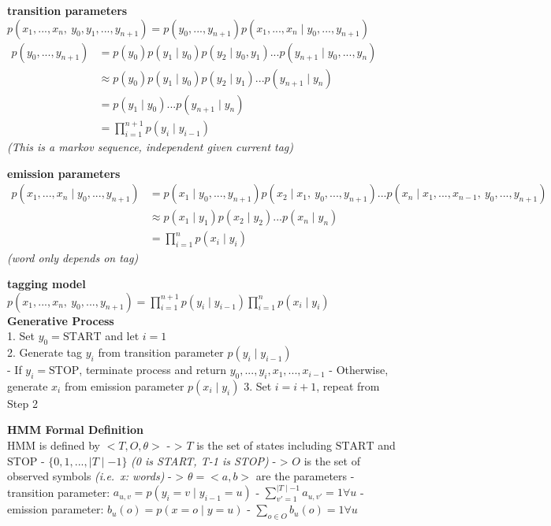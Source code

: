 \documentclass[11pt]{article}
\begin{document}
\textbf{transition parameters}\\
\(p(x_1,...,x_n,\ y_0,y_1,...,y_{n+1})=p(y_0,...,y_{n+1})p(x_1,...,x_n\mid y_0,...,y_{n+1})\)
\(\begin{aligned}p(y_0,...,y_{n+1})&=p(y_0)p(y_1\mid y_0)p(y_2\mid y_0,y_1)...p(y_{n+1}\mid y_0,...,y_n)\\&\approx p(y_0)p(y_1\mid y_0)p(y_2\mid y_1)...p(y_{n+1}\mid y_n)\\&=p(y_1\mid y_0)...p(y_{n+1}\mid y_n)\\&=\prod_{i=1}^{n+1}p(y_i\mid y_{i-1})\end{aligned}\)\\
\emph{(This is a markov sequence, independent given current tag)}

\textbf{emission parameters}\\
\(\begin{aligned}p(x_1,...,x_n\mid y_0,...,y_{n+1})&=p(x_1\mid y_0,...,y_{n+1})p(x_2\mid x_1,\ y_0,...,y_{n+1})...p(x_n\mid x_1,...,x_{n-1},\ y_0,...,y_{n+1})\\&\approx p(x_1\mid y_1)p(x_2\mid y_2)...p(x_n\mid y_n)\\&=\prod_{i=1}^np(x_i\mid y_i)\end{aligned}\)\\
\emph{(word only depends on tag)}

\textbf{tagging model}\\
\(p(x_1,...,x_n,\ y_0,...,y_{n+1})=\prod_{i=1}^{n+1}p(y_i\mid y_{i-1})\prod_{i=1}^np(x_i\mid y_i)\)\\
\textbf{Generative Process}\\
1. Set \(y_0 = \text{START}\) and let \(i=1\)\\
2. Generate tag \(y_i\) from transition parameter
\(p(y_i\mid y_{i-1})\)\\
- If \(y_i=\text{STOP}\), terminate process and return
\(y_0,...,y_{i},x_1,...,x_{i-1}\) - Otherwise, generate \(x_i\) from
emission parameter \(p(x_i\mid y_i)\) 3. Set \(i=i+1\), repeat from Step
2

\textbf{HMM Formal Definition}\\
HMM is defined by \(<T,O,\theta>\) - \textgreater{} \(T\) is the set of
states including \(\text{START}\) and \(\text{STOP}\) -
\(\{0,1,...,\mid T\mid-1\}\) \emph{(0 is START, \textbar{}T\textbar{}-1
is STOP)} - \textgreater{} \(O\) is the set of observed symbols
\emph{(i.e.~x: words)} - \textgreater{} \(\theta=<a,b>\) are the
parameters - transition parameter: \(a_{u,v}=p(y_i=v\mid y_{i-1}=u)\) -
\(\sum_{v'=1}^{\mid T\mid-1}a_{u,v'}=1 \forall u\) - emission parameter:
\(b_u(o)=p(x=o\mid y=u)\) - \(\sum_{o\in O}b_u(o)=1 \forall u\)
\end{document}

